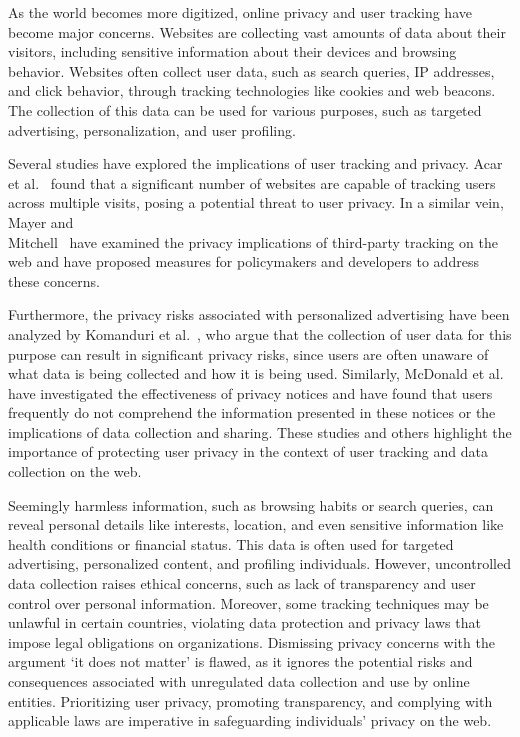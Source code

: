 
As the world becomes more digitized, online privacy and user tracking have become major concerns. Websites are collecting vast amounts of data about their visitors, including sensitive information about their devices and browsing behavior. Websites often collect user data, such as search queries, IP addresses, and click behavior, through tracking technologies like cookies and web beacons. The collection of this data can be used for various purposes, such as targeted advertising, personalization, and user profiling.
 
Several studies have explored the implications of user tracking and privacy. Acar et al.~\cite{acar2014} found that a significant number of websites are capable of tracking users across multiple visits, posing a potential threat to user privacy. In a similar vein, Mayer and \\ Mitchell~\cite{mayer2012} have examined the privacy implications of third-party tracking on the web and have proposed measures for policymakers and developers to address these concerns.

Furthermore, the privacy risks associated with personalized advertising have been analyzed by Komanduri et al.~\cite{komanduri2011}, who argue that the collection of user data for this purpose can result in significant privacy risks, since users are often unaware of what data is being collected and how it is being used. Similarly, McDonald et al.~\cite{mcdonald2009} have investigated the effectiveness of privacy notices and have found that users frequently do not comprehend the information presented in these notices or the implications of data collection and sharing. These studies and others highlight the importance of protecting user privacy in the context of user tracking and data collection on the web.

Seemingly harmless information, such as browsing habits or search queries, can reveal personal details like interests, location, and even sensitive information like health conditions or financial status. This data is often used for targeted advertising, personalized content, and profiling individuals. However, uncontrolled data collection raises ethical concerns, such as lack of transparency and user control over personal information. Moreover, some tracking techniques may be unlawful in certain countries, violating data protection and privacy laws that impose legal obligations on organizations. Dismissing privacy concerns with the argument `it does not matter' is flawed, as it ignores the potential risks and consequences associated with unregulated data collection and use by online entities. Prioritizing user privacy, promoting transparency, and complying with applicable laws are imperative in safeguarding individuals' privacy on the web.

